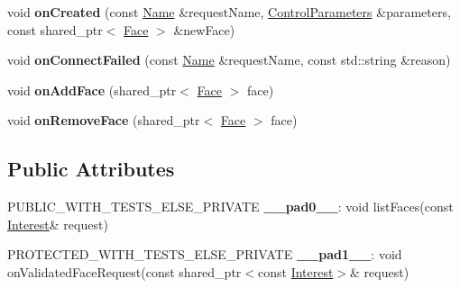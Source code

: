 \begin{DoxyCompactItemize}
\item 
void {\bfseries on\+Created} (const \hyperlink{classndn_1_1Name}{Name} \&request\+Name, \hyperlink{classndn_1_1nfd_1_1ControlParameters}{Control\+Parameters} \&parameters, const shared\+\_\+ptr$<$ \hyperlink{classnfd_1_1Face}{Face} $>$ \&new\+Face)\hypertarget{classnfd_1_1FaceManager_a67086e2f2f1ec707f189927361acfc29}{}\label{classnfd_1_1FaceManager_a67086e2f2f1ec707f189927361acfc29}

\item 
void {\bfseries on\+Connect\+Failed} (const \hyperlink{classndn_1_1Name}{Name} \&request\+Name, const std\+::string \&reason)\hypertarget{classnfd_1_1FaceManager_a7ca9beef5c86f02aec7eceddf421022a}{}\label{classnfd_1_1FaceManager_a7ca9beef5c86f02aec7eceddf421022a}

\item 
void {\bfseries on\+Add\+Face} (shared\+\_\+ptr$<$ \hyperlink{classnfd_1_1Face}{Face} $>$ face)\hypertarget{classnfd_1_1FaceManager_a9c5df28b0af4f9fdb77fc7e081d1a107}{}\label{classnfd_1_1FaceManager_a9c5df28b0af4f9fdb77fc7e081d1a107}

\item 
void {\bfseries on\+Remove\+Face} (shared\+\_\+ptr$<$ \hyperlink{classnfd_1_1Face}{Face} $>$ face)\hypertarget{classnfd_1_1FaceManager_a24db6f19e199e1ccb748af6794c3147b}{}\label{classnfd_1_1FaceManager_a24db6f19e199e1ccb748af6794c3147b}

\end{DoxyCompactItemize}
\subsection*{Public Attributes}
\begin{DoxyCompactItemize}
\item 
P\+U\+B\+L\+I\+C\+\_\+\+W\+I\+T\+H\+\_\+\+T\+E\+S\+T\+S\+\_\+\+E\+L\+S\+E\+\_\+\+P\+R\+I\+V\+A\+TE {\bfseries \+\_\+\+\_\+pad0\+\_\+\+\_\+}\+: void list\+Faces(const \hyperlink{classndn_1_1Interest}{Interest}\& request)\hypertarget{classnfd_1_1FaceManager_a46593c68645d98ba0f952f02d0a397da}{}\label{classnfd_1_1FaceManager_a46593c68645d98ba0f952f02d0a397da}

\item 
P\+R\+O\+T\+E\+C\+T\+E\+D\+\_\+\+W\+I\+T\+H\+\_\+\+T\+E\+S\+T\+S\+\_\+\+E\+L\+S\+E\+\_\+\+P\+R\+I\+V\+A\+TE {\bfseries \+\_\+\+\_\+pad1\+\_\+\+\_\+}\+: void on\+Validated\+Face\+Request(const shared\+\_\+ptr$<$const \hyperlink{classndn_1_1Interest}{Interest}$>$\& request)\hypertarget{classnfd_1_1FaceManager_a7d2e9427c32141594720eea0b1e0256b}{}\label{classnfd_1_1FaceManager_a7d2e9427c32141594720eea0b1e0256b}

\end{DoxyCompactItemize}
